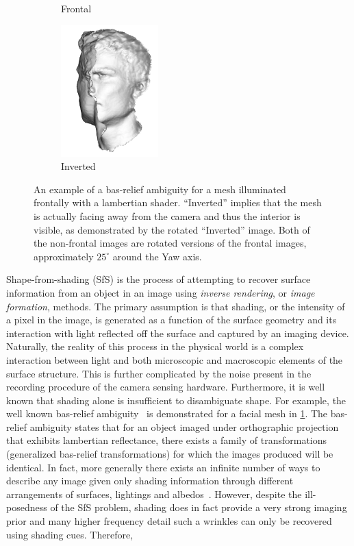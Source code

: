 \begin{figure}[t]
\begin{subfigure}[b]{0.24\textwidth}
		\caption*{Frontal}
	\end{subfigure}
	\begin{subfigure}[b]{0.24\textwidth}
		\centering
		\includegraphics[height=2in]{background/images/invert_rotate}
		\caption*{Inverted}
	\end{subfigure}
	\caption{An example of a bas-relief ambiguity for a mesh illuminated
	         frontally with a lambertian shader. ``Inverted'' implies
	         that the mesh is actually facing away from the camera and thus
	         the interior is visible, as demonstrated by the rotated
	         ``Inverted'' image. Both of the non-frontal images are rotated
	         versions of the frontal images, approximately $25^\circ$ around
	         the Yaw axis.}
\label{fig:sfs_bas_relief}
\end{figure}
Shape-from-shading (SfS) is the process of attempting to recover surface
information from an object in an image using \textit{inverse rendering}, 
or \textit{image formation}, methods. The primary assumption is that shading, or
the intensity of a pixel in the image, is generated as a function of the surface
geometry and its interaction with light reflected off the surface and captured
by an imaging device. Naturally, the reality of this process in the physical
world is a complex interaction between light and both microscopic and
macroscopic elements of the surface structure. This is further complicated by
the noise present in the recording procedure of the camera sensing
hardware. Furthermore, it is well known that shading alone is insufficient to
disambiguate shape. For example, the well known bas-relief
ambiguity~\cite{belhumeur1999bas} is demonstrated for a facial mesh in
\cref{fig:sfs_bas_relief}. The bas-relief ambiguity states that for an object
imaged under orthographic projection that exhibits lambertian reflectance, there
exists a family of transformations (generalized bas-relief transformations) for
which the images produced will be identical. In fact, more generally there
exists an infinite number of ways to describe any image given only shading
information through different arrangements of surfaces, lightings and
albedos~\cite{adelson1996perception}. However, despite the ill-posedness of the
SfS problem, shading does in fact provide a very strong imaging prior and many
higher frequency detail such a wrinkles can only be recovered using shading
cues. Therefore,
